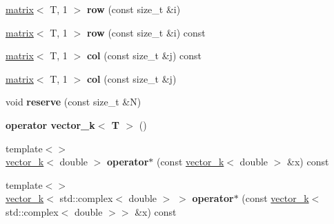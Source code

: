 \begin{DoxyCompactItemize}
\item 
\hypertarget{classkeycpp_1_1matrix_a7b0a3b0f85a9a2b2d9805a0c62ea7ce9}{\hyperlink{classkeycpp_1_1matrix}{matrix}$<$ T, 1 $>$ {\bfseries row} (const size\-\_\-t \&i)}\label{classkeycpp_1_1matrix_a7b0a3b0f85a9a2b2d9805a0c62ea7ce9}

\item 
\hypertarget{classkeycpp_1_1matrix_a9d3f4657a085099c9348f18a9a9a2bfa}{\hyperlink{classkeycpp_1_1matrix}{matrix}$<$ T, 1 $>$ {\bfseries row} (const size\-\_\-t \&i) const }\label{classkeycpp_1_1matrix_a9d3f4657a085099c9348f18a9a9a2bfa}

\item 
\hypertarget{classkeycpp_1_1matrix_af3976323ba896d2032e9d56faea5580b}{\hyperlink{classkeycpp_1_1matrix}{matrix}$<$ T, 1 $>$ {\bfseries col} (const size\-\_\-t \&j) const }\label{classkeycpp_1_1matrix_af3976323ba896d2032e9d56faea5580b}

\item 
\hypertarget{classkeycpp_1_1matrix_aac7e808302a0316596e88528ce18300b}{\hyperlink{classkeycpp_1_1matrix}{matrix}$<$ T, 1 $>$ {\bfseries col} (const size\-\_\-t \&j)}\label{classkeycpp_1_1matrix_aac7e808302a0316596e88528ce18300b}

\item 
\hypertarget{classkeycpp_1_1matrix_aed824ccff1fa8367ebf759704e063e36}{void {\bfseries reserve} (const size\-\_\-t \&N)}\label{classkeycpp_1_1matrix_aed824ccff1fa8367ebf759704e063e36}

\item 
\hypertarget{classkeycpp_1_1matrix_aae00b6698c9910ac76c1467877b66b07}{{\bfseries operator vector\-\_\-k$<$ T $>$} ()}\label{classkeycpp_1_1matrix_aae00b6698c9910ac76c1467877b66b07}

\item 
\hypertarget{classkeycpp_1_1matrix_ab6983d6eee299ccb2998c58bd0e027c9}{{\footnotesize template$<$$>$ }\\\hyperlink{classkeycpp_1_1vector__k}{vector\-\_\-k}$<$ double $>$ {\bfseries operator$\ast$} (const \hyperlink{classkeycpp_1_1vector__k}{vector\-\_\-k}$<$ double $>$ \&x) const}\label{classkeycpp_1_1matrix_ab6983d6eee299ccb2998c58bd0e027c9}

\item 
\hypertarget{classkeycpp_1_1matrix_ac785e98c5cd30b6070e1532236dbc26e}{{\footnotesize template$<$$>$ }\\\hyperlink{classkeycpp_1_1vector__k}{vector\-\_\-k}$<$ std\-::complex$<$ double $>$ $>$ {\bfseries operator$\ast$} (const \hyperlink{classkeycpp_1_1vector__k}{vector\-\_\-k}$<$ std\-::complex$<$ double $>$$>$ \&x) const}\label{classkeycpp_1_1matrix_ac785e98c5cd30b6070e1532236dbc26e}


\end{DoxyCompactItemize}
